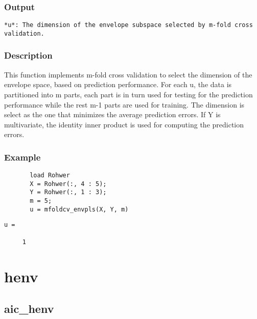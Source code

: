 \documentclass[a4paper,11pt,openany]{memoir}
\begin{document}
\subsection*{Output}


\begin{verbatim}*u*: The dimension of the envelope subspace selected by m-fold cross
validation.\end{verbatim}
   
    

\subsection*{Description}

\begin{par}
This function implements m-fold cross validation to select the dimension of the envelope space, based on prediction performance.  For each u, the data is partitioned into m parts, each part is in turn used for testing for the prediction performance while the rest m-1 parts are used for training.  The dimension is select as the one that minimizes the average prediction errors. If Y is multivariate, the identity inner product is used for computing the prediction errors.
\end{par} \vspace{1em}


\subsection*{Example}


\begin{verbatim}       load Rohwer
       X = Rohwer(:, 4 : 5);
       Y = Rohwer(:, 1 : 3);
       m = 5;
       u = mfoldcv_envpls(X, Y, m)\end{verbatim}
    
        \color{lightgray} \ttfamily\begin{verbatim}
u =

     1

\end{verbatim} \rmfamily
\color{black}

\newpage

\chapter{henv}

\rmfamily
\color{black}\section{aic\_henv}
\end{document}
